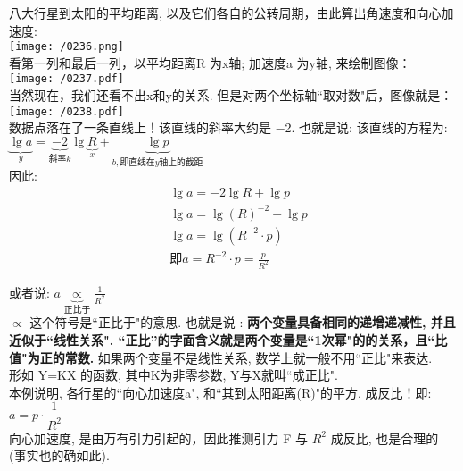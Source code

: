 \documentclass[UTF8]{ctexart}
\begin{document}
\begin{myEnvSample}
八大行星到太阳的平均距离, 以及它们各自的公转周期，由此算出角速度和向心加速度: \\
\texttt{[image: /0236.png]} \\

看第一列和最后一列，以平均距离R 为x轴; 加速度a 为y轴, 来绘制图像： \\

\texttt{[image: /0237.pdf]} \\

当然现在，我们还看不出x和y的关系. 但是对两个坐标轴``取对数"后，图像就是： \\
\texttt{[image: /0238.pdf]} \\

数据点落在了一条直线上！该直线的斜率大约是 −2.  也就是说: 该直线的方程为: \\
$
\underset{y}{\underbrace{\lg a}}=\underset{\text{斜率}k}{\underbrace{-2}}\lg \underset{x}{\underbrace{R}}+\underset{b,\text{即直线在}y\text{轴上的截距}}{\underbrace{\lg p}}
$ \\
因此: 
\begin{align*}  %
	&\lg a=-2\lg R+\lg p\\
&\lg a=\lg (R)^{-2}+\lg p\\
&\lg a=\lg (R^{-2}\cdot p)\\
&\text{即}a=R^{-2}\cdot p=\frac{p}{R^2}
\end{align*}

或者说: $a\underset{\text{正比于}}{\underbrace{\propto }}\frac{1}{R^2}$ \\

$\propto $ 这个符号是``正比于"的意思. 也就是说 : \textbf{两个变量具备相同的递增递减性, 并且近似于``线性关系". ``正比”的字面含义就是两个变量是``1次幂"的的关系，且``比值"为正的常数.} 如果两个变量不是线性关系, 数学上就一般不用``正比"来表达. \\
形如 Y=KX 的函数, 其中K为非零参数, Y与X就叫``成正比".  \\

本例说明, 各行星的``向心加速度a", 和``其到太阳距离(R)"的平方, 成反比！即: $a=p \cdot \dfrac{1}{R^2}$  \\
向心加速度, 是由万有引力引起的，因此推测引力 F 与 $R^2$ 成反比, 也是合理的 (事实也的确如此). 
\end{myEnvSample}
\end{document}

